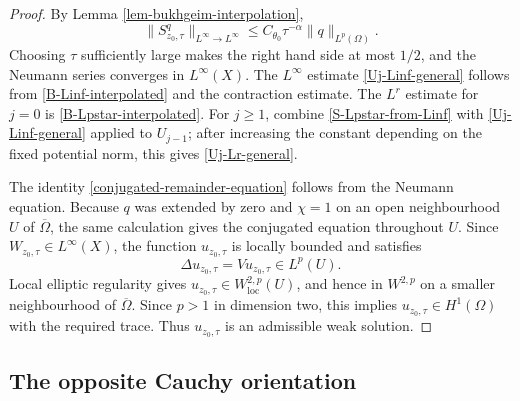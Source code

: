 \documentclass[a4paper,11pt]{article}
\theoremstyle{plain}
\theoremstyle{definition}
\theoremstyle{remark}
\begin{document}
\begin{proof}
By Lemma \ref{lem-bukhgeim-interpolation},
\begin{equation}
        \|S^q_{z_0,\tau}\|_{L^\infty\to L^\infty}
        \leq C_{\theta_0}\tau^{-\alpha}\|q\|_{L^p(\Omega)}.
\end{equation}
Choosing $\tau$ sufficiently large makes the right hand side at most $1/2$, and the Neumann series converges in $L^\infty(X)$.  The $L^\infty$ estimate \eqref{Uj-Linf-general} follows from \eqref{B-Linf-interpolated} and the contraction estimate.  The $L^r$ estimate for $j=0$ is \eqref{B-Lpstar-interpolated}.  For $j\geq1$, combine \eqref{S-Lpstar-from-Linf} with \eqref{Uj-Linf-general} applied to $U_{j-1}$; after increasing the constant depending on the fixed potential norm, this gives \eqref{Uj-Lr-general}.

The identity \eqref{conjugated-remainder-equation} follows from the Neumann equation.  Because $q$ was extended by zero and $\chi=1$ on an open neighbourhood $U$ of $\overline\Omega$, the same calculation gives the conjugated equation throughout $U$.  Since $W_{z_0,\tau}\in L^\infty(X)$, the function $u_{z_0,\tau}$ is locally bounded and satisfies
\begin{equation}
        \Delta u_{z_0,\tau}=Vu_{z_0,\tau}\in L^p(U).
\end{equation}
Local elliptic regularity gives $u_{z_0,\tau}\in W^{2,p}_{\mathrm{loc}}(U)$, and hence in $W^{2,p}$ on a smaller neighbourhood of $\overline\Omega$.  Since $p>1$ in dimension two, this implies $u_{z_0,\tau}\in H^1(\Omega)$ with the required trace.  Thus $u_{z_0,\tau}$ is an admissible weak solution.
\end{proof}


\subsection{The opposite Cauchy orientation}
\end{document}

